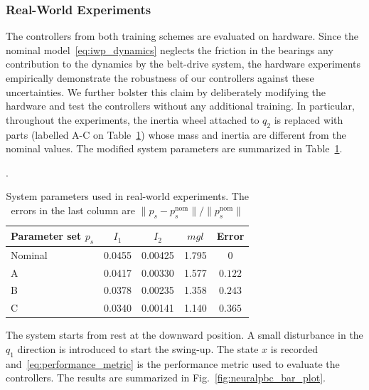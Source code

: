 \subsubsection{Real-World Experiments}

The controllers from both training schemes are evaluated on hardware. 
%
Since the nominal model~\eqref{eq:iwp_dynamics} neglects the friction in the
bearings any contribution to the dynamics by the belt-drive system, the hardware
experiments empirically demonstrate the robustness of our controllers against
these uncertainties.
%
We further bolster this claim by deliberately modifying the hardware and test
the controllers without any additional training.
%
In particular, throughout the experiments, the inertia wheel attached to $q_2$
is replaced with parts (labelled A-C on Table~\ref{tab:modified_params}) whose
mass and inertia are different from the nominal values.
%
The modified system parameters are summarized in
Table~\ref{tab:modified_params}.
%
\begin{table}[tb]
  \centering
  \caption{System parameters used in real-world experiments. The errors in the
  last column are $\|p_s - p^{\textrm{nom}}_{s}\| / \|p^{\textrm{nom}}_{s}\|$}.
  \begin{tabular}{lcccc}
    \toprule
    Parameter set $p_s$ & $I_1$ & $I_2$ & $mgl$ & Error \\
    \midrule
    Nominal & 0.0455 & 0.00425 & 1.795 & 0 \\
    A & 0.0417 & 0.00330 & 1.577 & $0.122$ \\
    B & 0.0378 & 0.00235 & 1.358 & $0.243$ \\
    C & 0.0340 & 0.00141 & 1.140 & $0.365$ \\
    \bottomrule
  \end{tabular}
  \label{tab:modified_params}
\end{table}
 
The system starts from rest at the downward position. 
%
A small disturbance in the $q_1$ direction is introduced to start the swing-up.
%
The state $x$ is recorded and~\eqref{eq:performance_metric} is the performance
metric used to evaluate the controllers.
%
%
%
The results are summarized in Fig.~\ref{fig:neuralpbc_bar_plot}.


